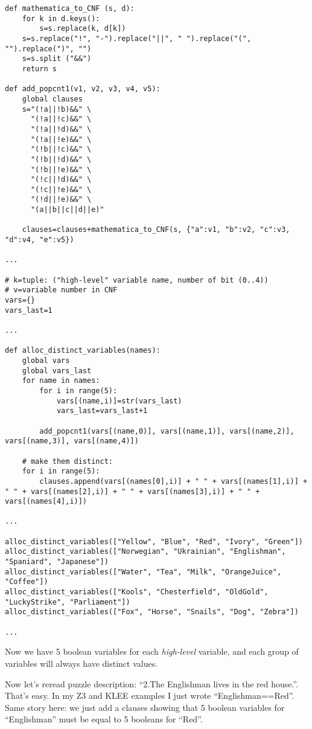 \begin{lstlisting}
def mathematica_to_CNF (s, d):
    for k in d.keys():
        s=s.replace(k, d[k])
    s=s.replace("!", "-").replace("||", " ").replace("(", "").replace(")", "")
    s=s.split ("&&")
    return s

def add_popcnt1(v1, v2, v3, v4, v5):
    global clauses
    s="(!a||!b)&&" \
      "(!a||!c)&&" \
      "(!a||!d)&&" \
      "(!a||!e)&&" \
      "(!b||!c)&&" \
      "(!b||!d)&&" \
      "(!b||!e)&&" \
      "(!c||!d)&&" \
      "(!c||!e)&&" \
      "(!d||!e)&&" \
      "(a||b||c||d||e)"

    clauses=clauses+mathematica_to_CNF(s, {"a":v1, "b":v2, "c":v3, "d":v4, "e":v5})

...

# k=tuple: ("high-level" variable name, number of bit (0..4))
# v=variable number in CNF
vars={}
vars_last=1

...

def alloc_distinct_variables(names):
    global vars
    global vars_last
    for name in names:
        for i in range(5):
            vars[(name,i)]=str(vars_last)
            vars_last=vars_last+1

        add_popcnt1(vars[(name,0)], vars[(name,1)], vars[(name,2)], vars[(name,3)], vars[(name,4)])

    # make them distinct:
    for i in range(5):
        clauses.append(vars[(names[0],i)] + " " + vars[(names[1],i)] + " " + vars[(names[2],i)] + " " + vars[(names[3],i)] + " " + vars[(names[4],i)])

...

alloc_distinct_variables(["Yellow", "Blue", "Red", "Ivory", "Green"])
alloc_distinct_variables(["Norwegian", "Ukrainian", "Englishman", "Spaniard", "Japanese"])
alloc_distinct_variables(["Water", "Tea", "Milk", "OrangeJuice", "Coffee"])
alloc_distinct_variables(["Kools", "Chesterfield", "OldGold", "LuckyStrike", "Parliament"])
alloc_distinct_variables(["Fox", "Horse", "Snails", "Dog", "Zebra"])

...

\end{lstlisting}

Now we have 5 boolean variables for each \emph{high-level} variable,
and each group of variables will always have distinct values.

Now let's reread puzzle description: ``2.The Englishman lives in the red house.''.
That's easy.
In my Z3 and KLEE examples I just wrote ``Englishman==Red''.
Same story here: we just add a clauses showing that 5 boolean variables for ``Englishman''
must be equal to 5 booleans for ``Red''.

